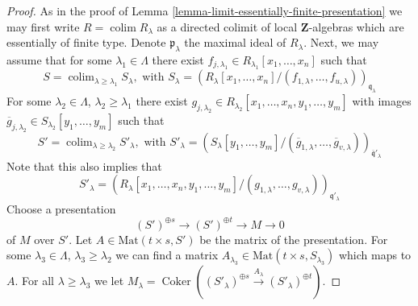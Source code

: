 \documentclass{amsart}
\theoremstyle{plain}
\theoremstyle{definition}
\theoremstyle{remark}
\numberwithin{equation}{subsection}
\def\colim{\mathop{\mathrm{colim}}\nolimits}
\def\Coker{\mathop{\mathrm{Coker}}}
\begin{document}
\begin{proof}
As in the proof of Lemma \ref{lemma-limit-essentially-finite-presentation}
we may first write $R = \colim R_\lambda$ as a directed colimit
of local $\mathbf{Z}$-algebras which are essentially of finite type.
Denote $\mathfrak p_\lambda$ the maximal ideal of $R_\lambda$.
Next, we may assume that for some $\lambda_1 \in \Lambda$ there
exist $f_{j, \lambda_1} \in R_{\lambda_1}[x_1, \ldots, x_n]$
such that
$$
S =
\colim_{\lambda \geq \lambda_1} S_\lambda, \text{ with }
S_\lambda =
(R_\lambda[x_1, \ldots, x_n]/
(f_{1, \lambda}, \ldots, f_{u, \lambda}))_{\mathfrak q_\lambda}
$$
For some $\lambda_2 \in \Lambda$,
$\lambda_2 \geq \lambda_1$ there exist
$g_{j, \lambda_2} \in R_{\lambda_2}[x_1, \ldots, x_n, y_1, \ldots, y_m]$
with images
$\overline{g}_{j, \lambda_2} \in S_{\lambda_2}[y_1, \ldots, y_m]$
such that
$$
S' =
\colim_{\lambda \geq \lambda_2} S'_\lambda, \text{ with }
S'_\lambda =
(S_\lambda[y_1, \ldots, y_m]/
(\overline{g}_{1, \lambda}, \ldots,
\overline{g}_{v, \lambda}))_{\overline{\mathfrak q}'_\lambda}
$$
Note that this also implies that
$$
S'_\lambda =
(R_\lambda[x_1, \ldots, x_n, y_1, \ldots, y_m]/
(g_{1, \lambda}, \ldots, g_{v, \lambda}))_{\mathfrak q'_\lambda}
$$
Choose a presentation
$$
(S')^{\oplus s} \to (S')^{\oplus t} \to M \to 0
$$
of $M$ over $S'$. Let $A \in \text{Mat}(t \times s, S')$ be
the matrix of the presentation. For some $\lambda_3 \in \Lambda$,
$\lambda_3 \geq \lambda_2$
we can find a matrix $A_{\lambda_3} \in \text{Mat}(t \times s, S_{\lambda_3})$
which maps to $A$. For all $\lambda \geq \lambda_3$ we let
$M_\lambda = \Coker((S'_\lambda)^{\oplus s} \xrightarrow{A_\lambda}
(S'_\lambda)^{\oplus t})$.


\end{proof}
\end{document}
